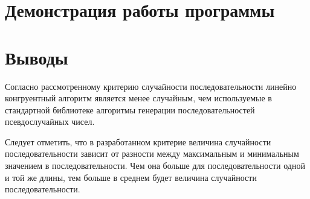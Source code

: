 \clearpage

\section*{Демонстрация работы программы}



\clearpage



\clearpage

\section*{Выводы}

Согласно рассмотренному критерию случайности последовательности линейно конгруентный алгоритм является менее случайным, чем используемые в стандартной библиотеке алгоритмы генерации последовательностей псевдослучайных чисел.

Следует отметить, что в разработанном критерие величина случайности последовательности зависит от разности между максимальным и минимальным значением в последовательности. Чем она больше для последовательности одной и той же длины, тем больше в среднем будет величина случайности последовательности.







